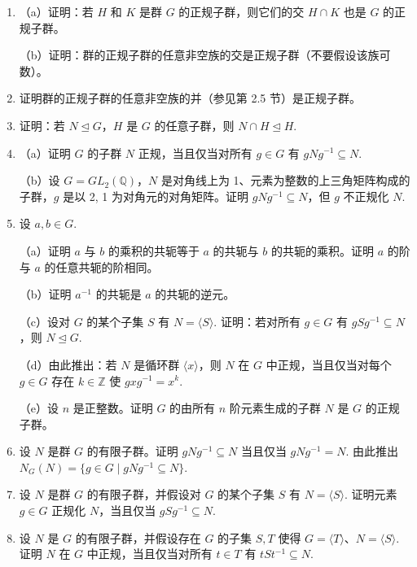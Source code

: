 \begin{enumerate}
（d）证明 \(\bar{G} \cong Z_4 \times Z_2\).

\item （a）证明：若 \(H\) 和 \(K\) 是群 \(G\) 的正规子群，则它们的交 \(H \cap K\) 也是 \(G\) 的正规子群。

（b）证明：群的正规子群的任意非空族的交是正规子群（不要假设该族可数）。

\item 证明群的正规子群的任意非空族的并（参见第 2.5 节）是正规子群。

\item 证明：若 \(N \trianglelefteq G\)，\(H\) 是 \(G\) 的任意子群，则 \(N \cap H \trianglelefteq H\).

\item （a）证明 \(G\) 的子群 \(N\) 正规，当且仅当对所有 \(g \in G\) 有 \(gNg^{-1} \subseteq N\).

（b）设 \(G = GL_2(\mathbb{Q})\)，\(N\) 是对角线上为 1、元素为整数的上三角矩阵构成的子群，\(g\) 是以 2, 1 为对角元的对角矩阵。证明 \(gNg^{-1} \subseteq N\)，但 \(g\) 不正规化 \(N\).

\item 设 \(a, b \in G\).

（a）证明 \(a\) 与 \(b\) 的乘积的共轭等于 \(a\) 的共轭与 \(b\) 的共轭的乘积。证明 \(a\) 的阶与 \(a\) 的任意共轭的阶相同。

（b）证明 \(a^{-1}\) 的共轭是 \(a\) 的共轭的逆元。

（c）设对 \(G\) 的某个子集 \(S\) 有 \(N = \langle S \rangle\). 证明：若对所有 \(g \in G\) 有 \(gSg^{-1} \subseteq N\)，则 \(N \trianglelefteq G\).

（d）由此推出：若 \(N\) 是循环群 \(\langle x \rangle\)，则 \(N\) 在 \(G\) 中正规，当且仅当对每个 \(g \in G\) 存在 \(k \in \mathbb{Z}\) 使 \(gxg^{-1} = x^k\).

（e）设 \(n\) 是正整数。证明 \(G\) 的由所有 \(n\) 阶元素生成的子群 \(N\) 是 \(G\) 的正规子群。

\item 设 \(N\) 是群 \(G\) 的有限子群。证明 \(gNg^{-1} \subseteq N\) 当且仅当 \(gNg^{-1} = N\). 由此推出 \(N_G(N) = \{g \in G \mid gNg^{-1} \subseteq N\}\).

\item 设 \(N\) 是群 \(G\) 的有限子群，并假设对 \(G\) 的某个子集 \(S\) 有 \(N = \langle S \rangle\). 证明元素 \(g \in G\) 正规化 \(N\)，当且仅当 \(gSg^{-1} \subseteq N\).

\item 设 \(N\) 是 \(G\) 的有限子群，并假设存在 \(G\) 的子集 \(S, T\) 使得 \(G = \langle T \rangle\)、\(N = \langle S \rangle\). 证明 \(N\) 在 \(G\) 中正规，当且仅当对所有 \(t \in T\) 有 \(tSt^{-1} \subseteq N\).


\end{enumerate}
